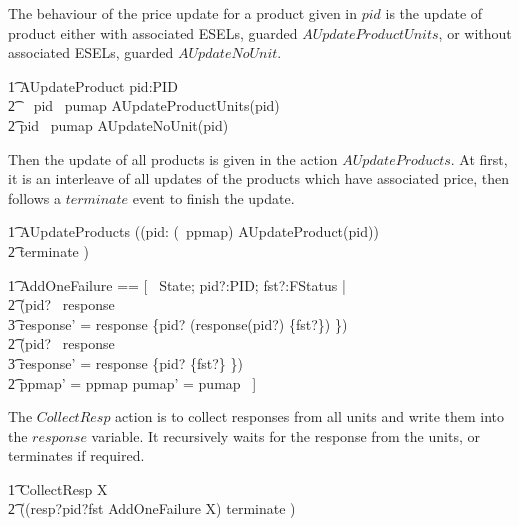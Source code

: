 The behaviour of the price update for a product given in $pid$ is the update of product either with associated ESELs, guarded $AUpdateProductUnits$, or without associated ESELs, guarded $AUpdateNoUnit$.  
\begin{circusaction}
        \t1 AUpdateProduct \circdef pid:PID \circspot \\
            \t2 \,\,\,\, \lcircguard pid \in \ran~pumap \rcircguard \circguard AUpdateProductUnits(pid) \\
            \t2 \extchoice \lcircguard pid \notin \ran~pumap \rcircguard \circguard AUpdateNoUnit(pid) \\
\end{circusaction}

Then the update of all products is given in the action $AUpdateProducts$. At first, it is an interleave of all updates of the products which have associated price, then follows a $terminate$ event to finish the update.
\begin{circusaction}
        \t1 AUpdateProducts \circdef ((\Interleave pid: (\dom~ppmap) \linter \emptyset \rinter \circspot AUpdateProduct(pid)) \\
        \t2 \circseq terminate \then \Skip) \\
\end{circusaction}

\begin{zed}
    \t1 AddOneFailure == [~ \Delta State; pid?:PID; fst?:FStatus | \\
        \t2 (pid? \in \dom~response \implies \\
            \t3 response' = response \oplus \{pid? \mapsto (response(pid?) \cup \{fst?\}) \}) \land \\
        \t2 (pid? \notin \dom~response \implies \\
            \t3 response' = response \cup \{pid? \mapsto \{fst?\} \}) \land \\
        \t2 ppmap' = ppmap \land pumap' = pumap ~]
\end{zed}
The $CollectResp$ action is to collect responses from all units and write them into the $response$ variable. It recursively waits for the response from the units, or terminates if required.
\begin{circusaction}
        \t1 CollectResp \circdef \circmu X \circspot \\
            \t2 ((resp?pid?fst \then \lschexpract AddOneFailure \rschexpract \circseq X) \extchoice terminate \then \Skip) \\
\end{circusaction}

